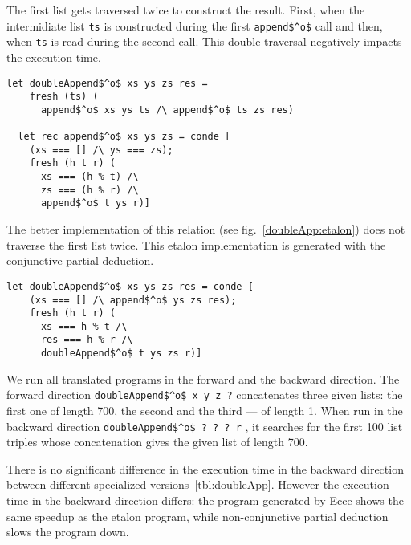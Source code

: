 The first list gets traversed twice to construct the result.
First, when the intermidiate list \lstinline{ts} is constructed during the first \lstinline{append$^o$} call and then, when \lstinline{ts} is read during the second call.
This double traversal negatively impacts the execution time.

\begin{figure*}[!h]
  \centering
  \begin{minipage}{0.6\textwidth}
    \begin{lstlisting}[label={doubleApp}, caption={Concatenation of three lists}, captionpos=b, frame=tb]
  let doubleAppend$^o$ xs ys zs res =
    fresh (ts) (
      append$^o$ xs ys ts /\ append$^o$ ts zs res)

  let rec append$^o$ xs ys zs = conde [
    (xs === [] /\ ys === zs);
    fresh (h t r) (
      xs === (h % t) /\
      zs === (h % r) /\
      append$^o$ t ys r)]
    \end{lstlisting}
  \end{minipage}
\end{figure*}

The better implementation of this relation (see fig.~\ref{doubleApp:etalon}) does not traverse the first list twice.
This etalon implementation is generated with the conjunctive partial deduction.

\begin{figure*}[!h]
  \centering
  \begin{minipage}{0.6\textwidth}
    \begin{lstlisting}[label={doubleApp:etalon}, caption={Etalon implementation of concatenation of three lists}, captionpos=b, frame=tb]
  let doubleAppend$^o$ xs ys zs res = conde [
    (xs === [] /\ append$^o$ ys zs res);
    fresh (h t r) (
      xs === h % t /\
      res === h % r /\
      doubleAppend$^o$ t ys zs r)]
    \end{lstlisting}
  \end{minipage}
\end{figure*}

We run all translated programs in the forward and the backward direction.
The forward direction \lstinline{doubleAppend$^o$ x y z ?} concatenates three given lists: the first one of length 700, the second and the third --- of length 1.
When run in the backward direction \lstinline{doubleAppend$^o$ ? ? ? r} , it searches for the first 100 list triples whose concatenation gives the given list of length 700.

There is no significant difference in the execution time in the backward direction between different specialized versions~\ref{tbl:doubleApp}.
However the execution time in the backward direction differs: the program generated by Ecce shows the same speedup as the etalon program, while non-conjunctive partial deduction slows the program down.

